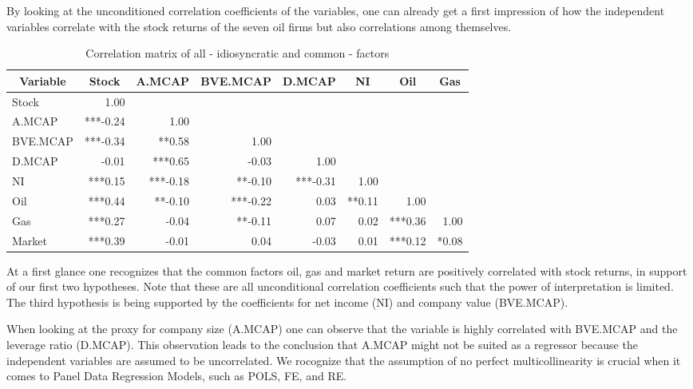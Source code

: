 \documentclass[a4paper]{article}
\begin{document}
By looking at the unconditioned correlation coefficients of the variables, one can already get a first impression of how the independent variables correlate with the stock returns of the seven oil firms but also correlations among themselves.

\begin{table}[ht]
\begin{tabular}{l|r|r|r|r|r|r|r}
\hline
\hline
\multicolumn{1}{c|}{Variable} & \multicolumn{1}{c|}{Stock} & \multicolumn{1}{c|}{A.MCAP} & \multicolumn{1}{c|}{BVE.MCAP} & \multicolumn{1}{c|}{D.MCAP} & \multicolumn{1}{c|}{NI} & \multicolumn{1}{c|}{Oil} & \multicolumn{1}{c}{Gas} \\
\hline
Stock &  1.00  &  &  &  &  &  &  \\ 
  A.MCAP & ***-0.24 &  1.00  &  &  &  &  &  \\ 
  BVE.MCAP & ***-0.34 & **0.58 &  1.00  &  &  &  &  \\ 
  D.MCAP & -0.01 & ***0.65 & -0.03  &  1.00  &  &  &  \\ 
  NI & ***0.15 & ***-0.18 & **-0.10  & ***-0.31 &  1.00  &  &  \\ 
  Oil & ***0.44 & **-0.10 & ***-0.22 &  0.03  & **0.11 &  1.00  &  \\ 
  Gas & ***0.27 & -0.04  & **-0.11  &  0.07  &  0.02  & ***0.36 &  1.00  \\ 
  Market & ***0.39 & -0.01  &  0.04  & -0.03  &  0.01  & ***0.12 & *0.08  \\ 
\hline
\hline
\end{tabular}
\label{}
\centering
\caption{Correlation matrix of all - idiosyncratic and common - factors}
\end{table}

At a first glance one recognizes that the common factors oil, gas and market return are positively correlated with stock returns, in support of our first two hypotheses. Note that these are all unconditional correlation coefficients such that the power of interpretation is limited. The third hypothesis is being supported by the coefficients for net income (NI) and company value (BVE.MCAP). 

When looking at the proxy for company size (A.MCAP) one can observe that the variable is highly correlated with BVE.MCAP and the leverage ratio (D.MCAP). This observation leads to the conclusion that A.MCAP might not be suited as a regressor because the independent variables are assumed to be uncorrelated. We rocognize that the assumption of no perfect multicollinearity is crucial when it comes to Panel Data Regression Models, such as POLS, FE, and RE.
\end{document}
